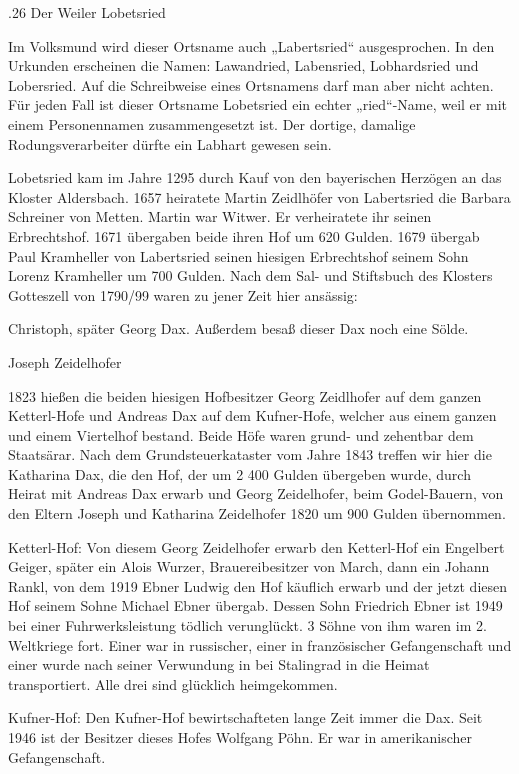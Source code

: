 \documentclass{book}
\begin{document}
.26 Der Weiler Lobetsried

Im Volksmund wird dieser Ortsname auch „Labertsried“ ausgesprochen. In den
Urkunden erscheinen die Namen: Lawandried, Labensried, Lobhardsried und
Lobersried. Auf die Schreibweise eines Ortsnamens darf man aber nicht achten.
Für jeden Fall ist dieser Ortsname Lobetsried ein echter „ried“-Name, weil er
mit einem Personennamen zusammengesetzt ist. Der dortige, damalige
Rodungsverarbeiter dürfte ein Labhart gewesen sein.

Lobetsried kam im Jahre 1295 durch Kauf von den bayerischen Herzögen an das
Kloster Aldersbach. 1657 heiratete Martin Zeidlhöfer von Labertsried die Barbara
Schreiner von Metten. Martin war Witwer. Er verheiratete ihr seinen
Erbrechtshof. 1671 übergaben beide ihren Hof um 620 Gulden. 1679 übergab Paul
Kramheller von Labertsried seinen hiesigen Erbrechtshof seinem Sohn Lorenz
Kramheller um 700 Gulden. Nach dem Sal- und Stiftsbuch des Klosters Gotteszell
von 1790/99 waren zu jener Zeit hier ansässig:



Christoph, später Georg Dax. Außerdem besaß dieser Dax noch eine Sölde.

Joseph Zeidelhofer



1823 hießen die beiden hiesigen Hofbesitzer Georg Zeidlhofer auf dem ganzen
Ketterl-Hofe und Andreas Dax auf dem Kufner-Hofe, welcher aus einem ganzen und
einem Viertelhof bestand. Beide Höfe waren grund- und zehentbar dem Staatsärar.
Nach dem Grundsteuerkataster vom Jahre 1843 treffen wir hier die Katharina Dax,
die den Hof, der um 2 400 Gulden übergeben wurde, durch Heirat mit Andreas Dax
erwarb und Georg Zeidelhofer, beim Godel-Bauern, von den Eltern Joseph und
Katharina Zeidelhofer 1820 um 900 Gulden übernommen.

Ketterl-Hof: Von diesem Georg Zeidelhofer erwarb den Ketterl-Hof ein Engelbert
Geiger, später ein Alois Wurzer, Brauereibesitzer von March, dann ein Johann
Rankl, von dem 1919 Ebner Ludwig den Hof käuflich erwarb und der jetzt diesen
Hof seinem Sohne Michael Ebner übergab. Dessen Sohn Friedrich Ebner ist 1949 bei
einer Fuhrwerksleistung tödlich verunglückt. 3 Söhne von ihm waren im 2.
Weltkriege fort. Einer war in russischer, einer in französischer Gefangenschaft
und einer wurde nach seiner Verwundung in bei Stalingrad in die Heimat
transportiert. Alle drei sind glücklich heimgekommen.

Kufner-Hof: Den Kufner-Hof bewirtschafteten lange Zeit immer die Dax. Seit 1946
ist der Besitzer dieses Hofes Wolfgang Pöhn. Er war in amerikanischer
Gefangenschaft.
\end{document}
